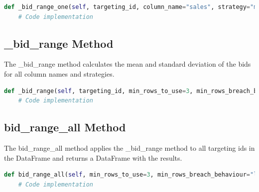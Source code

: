 \begin{lstlisting}[language=Python]
def _bid_range_one(self, targeting_id, column_name="sales", strategy="maximize", min_rows_to_use=3, min_rows_breach_behaviour="warn", data_return_type="mean_std", remove_outliers=True):
    # Code implementation
\end{lstlisting}

\subsection{\_bid\_range Method}

The \_bid\_range method calculates the mean and standard deviation of the bids for all column names and strategies.

\begin{lstlisting}[language=Python]
def _bid_range(self, targeting_id, min_rows_to_use=3, min_rows_breach_behaviour="leave", data_return_type="mean_std", remove_outliers=True):
    # Code implementation
\end{lstlisting}

\subsection{bid\_range\_all Method}

The bid\_range\_all method applies the \_bid\_range method to all targeting ids in the DataFrame and returns a DataFrame with the results.

\begin{lstlisting}[language=Python]
def bid_range_all(self, min_rows_to_use=3, min_rows_breach_behaviour="leave", data_return_type="mean_std", remove_outliers=True):
    # Code implementation
\end{lstlisting}
